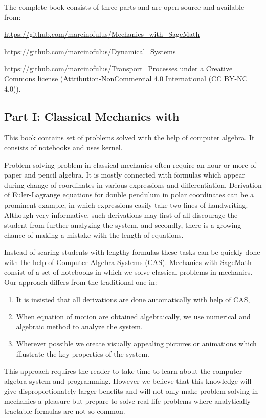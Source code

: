 \documentclass{deliverablereport}
\begin{document}
The complete book consists of three parts and are  open source and available from:\newline
{\url{https://github.com/marcinofulus/Mechanics_with_SageMath}\linebreak
{\url{https://github.com/marcinofulus/Dynamical_Systems}\linebreak
{\url{https://github.com/marcinofulus/Transport_Processes}\linebreak
under a Creative Commons license (Attribution-NonCommercial 4.0
International (CC BY-NC 4.0)).

\subsection{Part I: Classical Mechanics with \SageMath}

This book contains set of problems solved with the help of computer
algebra. It consists of \Jupyter notebooks and uses  \SageMath kernel.

Problem solving problem in classical mechanics often require an hour
or more of paper and pencil algebra. It is mostly connected with
formulas which appear during change of coordinates in various
expressions and differentiation. Derivation of Euler-Lagrange
equations for double pendulum in polar coordinates can be a prominent
example, in which expressions easily take two lines of handwriting.
Although very informative, such derivations may first of all discourage
the student from further analyzing the system, and secondly, there is
a growing chance of making a mistake with the length of equations.

Instead of scaring students with lengthy formulas these tasks can be
quickly done with the help of Computer Algebra Systems
(CAS). Mechanics with SageMath consist of a set of notebooks in which
we solve classical problems in mechanics. Our approach differs from
the traditional one in:
\begin{enumerate}
\item It is insisted that all derivations are done automatically with
  help of CAS,
\item When equation of motion are obtained algebraically, we use
  numerical and algebraic method to analyze the system.
\item Wherever possible we create visually appealing pictures or
  animations which illustrate the key properties of the system.
\end{enumerate}

This approach requires the reader to take time to learn about the
computer algebra system and programming. However we believe that this
knowledge will give disproportionately larger benefits and will not
only make problem solving in mechanics a pleasure but prepare to solve
real life problems where analytically tractable formulas are not so
common.



}}}
\end{document}
